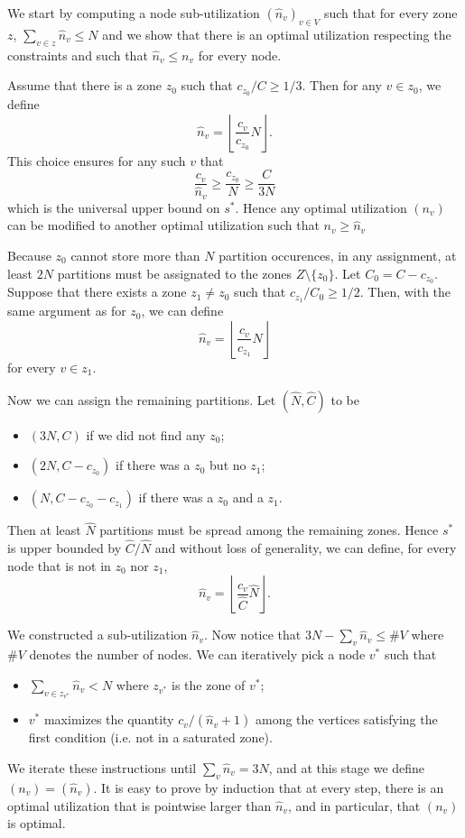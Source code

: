 \documentclass[]{article}
\begin{document}
We start by computing a node sub-utilization $(\hat{n}_v)_{v\in V}$ such that for every zone $z$, $\sum_{v\in z} \hat{n}_v \le N$ and we show that there is an optimal utilization respecting the constraints and such that $\hat{n}_v \le n_v$ for every node.

Assume that there is a zone $z_0$ such that $c_{z_0}/C \ge 1/3$. Then for any $v\in z_0$, we define 
$$\hat{n}_v = \left\lfloor\frac{c_v}{c_{z_0}}N\right\rfloor.$$ 
This choice ensures for any such $v$ that
$$
\frac{c_v}{\hat{n}_v} \ge \frac{c_{z_0}}{N} \ge \frac{C}{3N}
$$
which is the universal upper bound on $s^*$. Hence any optimal utilization $(n_v)$ can be modified to another optimal utilization such that $n_v\ge \hat{n}_v$

Because $z_0$ cannot store more than $N$ partition occurences, in any assignment, at least $2N$ partitions must be assignated to the zones $Z\setminus\{z_0\}$. Let $C_0 = C-c_{z_0}$. Suppose that there exists a zone $z_1\neq z_0$ such that $c_{z_1}/C_0 \ge 1/2$. Then, with the same argument as for $z_0$, we can define 
$$\hat{n}_v = \left\lfloor\frac{c_v}{c_{z_1}}N\right\rfloor$$
for every $v\in z_1$.

Now we can assign the remaining partitions. Let $(\hat{N}, \hat{C})$ to be
\begin{itemize}
	\item $(3N,C)$ if we did not find any $z_0$;
	\item $(2N,C-c_{z_0})$ if there was a $z_0$ but no $z_1$;
	\item $(N,C-c_{z_0}-c_{z_1})$ if there was a $z_0$ and a $z_1$.
\end{itemize}
Then at least $\hat{N}$ partitions must be spread among the remaining zones. Hence $s^*$ is upper bounded by $\hat{C}/\hat{N}$ and without loss of generality, we can define, for every node that is not in $z_0$ nor $z_1$, 
$$\hat{n}_v = \left\lfloor\frac{c_v}{\hat{C}}\hat{N}\right\rfloor.$$ 

We constructed a sub-utilization $\hat{n}_v$. Now notice that $3N-\sum_v \hat{n}_v \le \# V$ where $\# V$ denotes the number of nodes. We can iteratively pick a node $v^*$ such that 
\begin{itemize}
	\item $\sum_{v\in z_{v^*}} \hat{n}_v < N$ where $z_{v^*}$ is the zone of $v^*$;
	\item $v^*$ maximizes the quantity $c_v/(\hat{n}_v+1)$ among the vertices satisfying the first condition (i.e. not in a saturated zone).
\end{itemize}
We iterate these instructions until $\sum_v \hat{n}_v= 3N$, and at this stage we define $(n_v) = (\hat{n}_v)$. It is easy to prove by induction that at every step, there is an optimal utilization that is pointwise larger than $\hat{n}_v$, and in particular, that $(n_v)$ is optimal.
\end{document}
